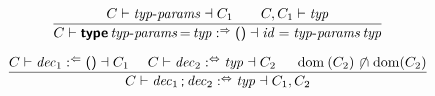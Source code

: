$$
\frac{
  C \vdash \x{typ-params} \dashv C_1
  \qquad
  C, C_1 \vdash \x{typ}
}{
  C \vdash \KK{type} \x{typ-params} \K= \x{typ} \synth \K{()} \dashv \x{id} = \x{typ-params} \x{typ}
}
$$

$$
\frac{
  C \vdash \x{dec}_1 \anal \K{()} \dashv C_1
  \quad~
  C \vdash \x{dec}_2 \analsynth \x{typ} \dashv C_2
  \quad~
  \Dom(C_2) \setdisj \Dom(C_2)
}{
  C \vdash \x{dec}_1 \K; \x{dec}_2 \analsynth \x{typ} \dashv C_1, C_2
}
$$
